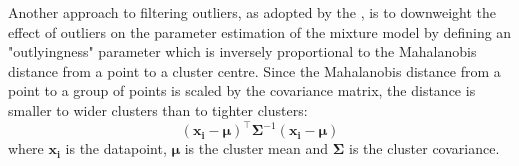 

Another approach to filtering outliers, as adopted by the , is to downweight the effect of outliers on the parameter estimation of the mixture model by defining an "outlyingness" parameter which is inversely proportional to the Mahalanobis distance from a point to a cluster centre.  
Since the Mahalanobis distance from a point to a group of points is scaled by the covariance matrix, the distance is smaller to wider clusters than to tighter clusters:
\begin{equation} \label{equation:Mahalanobis}
(\boldsymbol{x_i}-\boldsymbol{\mu})^{\top}\boldsymbol{\Sigma}^{-1}(\boldsymbol{x_i}-\boldsymbol{\mu})
\end{equation}
where $\boldsymbol{x_i}$ is the datapoint, $\boldsymbol{\mu}$ is the cluster mean and $\boldsymbol{\Sigma}$ is the cluster covariance.

